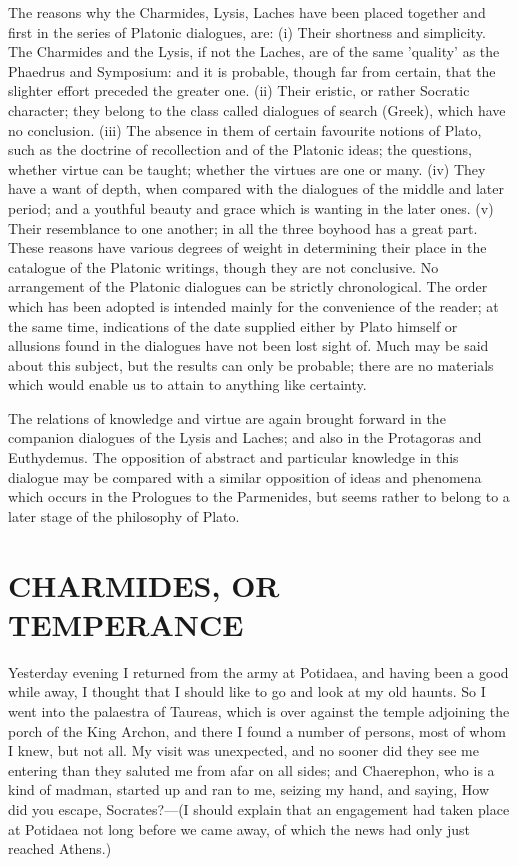 \documentclass[11pt,letter]{article}
\begin{document}
\par  The reasons why the Charmides, Lysis, Laches have been placed together and first in the series of Platonic dialogues, are: (i) Their shortness and simplicity. The Charmides and the Lysis, if not the Laches, are of the same 'quality' as the Phaedrus and Symposium: and it is probable, though far from certain, that the slighter effort preceded the greater one. (ii) Their eristic, or rather Socratic character; they belong to the class called dialogues of search (Greek), which have no conclusion. (iii) The absence in them of certain favourite notions of Plato, such as the doctrine of recollection and of the Platonic ideas; the questions, whether virtue can be taught; whether the virtues are one or many. (iv) They have a want of depth, when compared with the dialogues of the middle and later period; and a youthful beauty and grace which is wanting in the later ones. (v) Their resemblance to one another; in all the three boyhood has a great part. These reasons have various degrees of weight in determining their place in the catalogue of the Platonic writings, though they are not conclusive. No arrangement of the Platonic dialogues can be strictly chronological. The order which has been adopted is intended mainly for the convenience of the reader; at the same time, indications of the date supplied either by Plato himself or allusions found in the dialogues have not been lost sight of. Much may be said about this subject, but the results can only be probable; there are no materials which would enable us to attain to anything like certainty.

\par  The relations of knowledge and virtue are again brought forward in the companion dialogues of the Lysis and Laches; and also in the Protagoras and Euthydemus. The opposition of abstract and particular knowledge in this dialogue may be compared with a similar opposition of ideas and phenomena which occurs in the Prologues to the Parmenides, but seems rather to belong to a later stage of the philosophy of Plato.

\par 
\section{
      CHARMIDES,   OR TEMPERANCE
    }
\par 
  
\par  Yesterday evening I returned from the army at Potidaea, and having been a good while away, I thought that I should like to go and look at my old haunts. So I went into the palaestra of Taureas, which is over against the temple adjoining the porch of the King Archon, and there I found a number of persons, most of whom I knew, but not all. My visit was unexpected, and no sooner did they see me entering than they saluted me from afar on all sides; and Chaerephon, who is a kind of madman, started up and ran to me, seizing my hand, and saying, How did you escape, Socrates?—(I should explain that an engagement had taken place at Potidaea not long before we came away, of which the news had only just reached Athens.)
\end{document}
